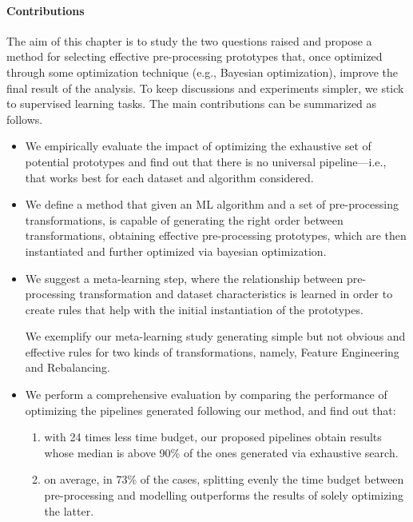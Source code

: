 \paragraph{Contributions} The aim of this chapter is to study the two questions raised and propose a method for selecting effective pre-processing prototypes that, once optimized through some optimization technique (e.g., Bayesian optimization), improve the final result of the analysis.
To keep discussions and experiments simpler, we stick to supervised learning tasks.
The main contributions can be summarized as follows.
\begin{itemize}
    \item We empirically evaluate the impact of optimizing the exhaustive set of potential prototypes and find out that
	there is no universal pipeline---i.e., that works best for each dataset and algorithm considered.
    \item We define a method that given an ML algorithm and a set of pre-processing transformations, is capable of generating the right order between transformations, obtaining effective pre-processing prototypes, which are then instantiated and further optimized via bayesian optimization.
    \item We suggest a meta-learning step, where the relationship between pre-processing transformation and dataset characteristics is learned in order to create rules that help with the initial instantiation of the prototypes.

	We exemplify our meta-learning study generating simple but not obvious and effective rules for two kinds of transformations, namely, Feature Engineering and Rebalancing.

    \item We perform a comprehensive evaluation by comparing the performance of optimizing the pipelines generated following our method, and find out that:
    \begin{enumerate}
        \item with 24 times less time budget, our proposed pipelines obtain results whose median is above 90\% of the ones generated via exhaustive search.
        \item on average, in 73\% of the cases, splitting evenly the time budget between pre-processing and modelling outperforms the results of solely optimizing the latter.
    \end{enumerate}
\end{itemize}

